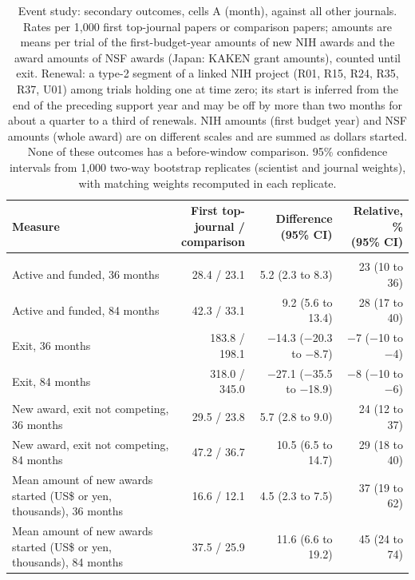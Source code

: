\begin{table}[H]
\centering\small
\caption{Event study: secondary outcomes, cells A (month), against all other journals. Rates per 1,000 first top-journal papers or comparison papers; amounts are means per trial of the first-budget-year amounts of new NIH awards and the award amounts of NSF awards (Japan: KAKEN grant amounts), counted until exit. Renewal: a type-2 segment of a linked NIH project (R01, R15, R24, R35, R37, U01) among trials holding one at time zero; its start is inferred from the end of the preceding support year and may be off by more than two months for about a quarter to a third of renewals. NIH amounts (first budget year) and NSF amounts (whole award) are on different scales and are summed as dollars started. None of these outcomes has a before-window comparison. 95\% confidence intervals from 1,000 two-way bootstrap replicates (scientist and journal weights), with matching weights recomputed in each replicate.}\label{tab:s_event_secondary}
\footnotesize
\begin{tabularx}{\linewidth}{>{\raggedright\arraybackslash}Xrrr}
\toprule
Measure & \makecell[rb]{First top-\\journal /\\comparison} & \makecell[rb]{Difference\\(95\% CI)} & \makecell[rb]{Relative, \%\\(95\% CI)} \\
\midrule
\multicolumn{4}{>{\raggedright\arraybackslash}p{\dimexpr\textwidth-2\tabcolsep\relax}}{\textit{US 2014--2021, last authors}} \\
Active and funded, 36 months & 28.4 / 23.1 & 5.2 (2.3 to 8.3) & 23 (10 to 36) \\
Active and funded, 84 months & 42.3 / 33.1 & 9.2 (5.6 to 13.4) & 28 (17 to 40) \\
Exit, 36 months & 183.8 / 198.1 & $-$14.3 ($-$20.3 to $-$8.7) & $-$7 ($-$10 to $-$4) \\
Exit, 84 months & 318.0 / 345.0 & $-$27.1 ($-$35.5 to $-$18.9) & $-$8 ($-$10 to $-$6) \\
New award, exit not competing, 36 months & 29.5 / 23.8 & 5.7 (2.8 to 9.0) & 24 (12 to 37) \\
New award, exit not competing, 84 months & 47.2 / 36.7 & 10.5 (6.5 to 14.7) & 29 (18 to 40) \\
Mean amount of new awards started (US\$ or yen, thousands), 36 months & 16.6 / 12.1 & 4.5 (2.3 to 7.5) & 37 (19 to 62) \\
Mean amount of new awards started (US\$ or yen, thousands), 84 months & 37.5 / 25.9 & 11.6 (6.6 to 19.2) & 45 (24 to 74) \\

\end{tabularx}
\end{table}
